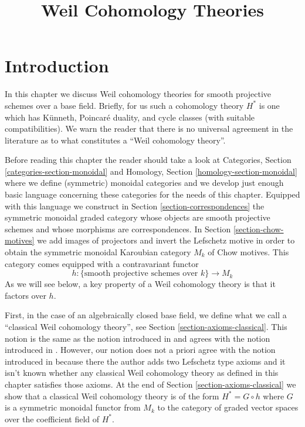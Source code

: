 \documentclass{stacks-project}
\theoremstyle{plain}
\theoremstyle{definition}
\theoremstyle{remark}
\numberwithin{equation}{subsection}
\begin{document}
\title{Weil Cohomology Theories}


\maketitle

\label{section-phantom}

\tableofcontents



\section{Introduction}
\label{section-introduction}

\noindent
In this chapter we discuss Weil cohomology theories for smooth
projective schemes over a base field. Briefly, for us such a cohomology
theory $H^*$ is one which has K\"unneth, Poincar\'e duality,
and cycle classes (with suitable compatibilities). We warn the reader that
there is no universal agreement in the literature as to what
constitutes a ``Weil cohomology theory''.

\medskip\noindent
Before reading this chapter the reader should take a look at
Categories, Section \ref{categories-section-monoidal} and
Homology, Section \ref{homology-section-monoidal} where
we define (symmetric) monoidal categories and we develop just enough
basic language concerning these categories for the needs of this chapter.
Equipped with this language we construct in
Section \ref{section-correspondences} the symmetric monoidal
graded category whose objects are smooth projective schemes and
whose morphisms are correspondences. In Section \ref{section-chow-motives}
we add images of projectors and invert the Lefschetz motive in
order to obtain the symmetric monoidal Karoubian category $M_k$
of Chow motives. This category comes equipped with a contravariant functor
$$
h : \{\text{smooth projective schemes over }k\} \longrightarrow M_k
$$
As we will see below, a key property of a Weil cohomology theory is
that it factors over $h$.

\medskip\noindent
First, in the case of an algebraically closed base field, we define
what we call a ``classical Weil cohomology theory'',
see Section \ref{section-axioms-classical}. This notion is the
same as the notion introduced in \cite[Section 1.2]{Kleiman-cycles} and
agrees with the notion introduced in \cite[page 65]{Kleiman-motives}.
However, our notion does not a priori agree with the notion introduced in
\cite[page 10]{Kleiman-standard} because there the author adds two Lefschetz
type axioms and it isn't known whether any classical Weil cohomology
theory as defined in this chapter satisfies those axioms.
At the end of Section \ref{section-axioms-classical} we show that
a classical Weil cohomology theory is of the form $H^* = G \circ h$
where $G$ is a symmetric monoidal functor from $M_k$ to the category
of graded vector spaces over the coefficient field of $H^*$.
\end{document}
